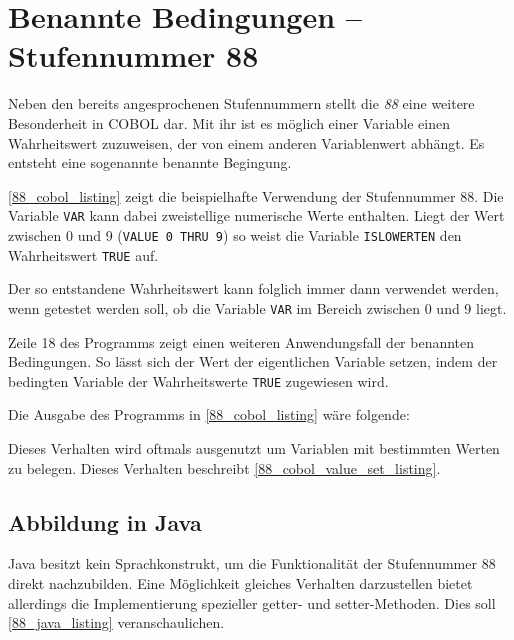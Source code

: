 \section{Benannte Bedingungen -- Stufennummer 88}
Neben den bereits angesprochenen Stufennummern stellt die \textit{88} eine weitere Besonderheit in COBOL dar. Mit ihr ist es möglich einer Variable einen Wahrheitswert zuzuweisen, der von einem anderen Variablenwert abhängt. Es entsteht eine sogenannte benannte Begingung.


\autoref{88_cobol_listing} zeigt die beispielhafte Verwendung der Stufennummer 88. Die Variable \texttt{VAR} kann dabei zweistellige numerische Werte enthalten. Liegt der Wert zwischen 0 und 9 (\texttt{VALUE 0 THRU 9}) so weist die Variable \texttt{ISLOWERTEN} den Wahrheitswert \texttt{TRUE} auf.

Der so entstandene Wahrheitswert kann folglich immer dann verwendet werden, wenn getestet werden soll, ob die Variable \texttt{VAR} im Bereich zwischen 0 und 9 liegt.

Zeile 18 des Programms zeigt einen weiteren Anwendungsfall der benannten Bedingungen. So lässt sich der Wert der eigentlichen Variable setzen, indem der bedingten Variable der Wahrheitswerte \texttt{TRUE} zugewiesen wird.

Die Ausgabe des Programms in \autoref{88_cobol_listing} wäre folgende:

Dieses Verhalten wird oftmals ausgenutzt um Variablen mit bestimmten Werten zu belegen. Dieses Verhalten beschreibt \autoref{88_cobol_value_set_listing}.


\subsection*{Abbildung in Java}
Java besitzt kein Sprachkonstrukt, um die Funktionalität der Stufennummer 88 direkt nachzubilden. Eine Möglichkeit gleiches Verhalten darzustellen bietet allerdings die Implementierung spezieller getter- und setter-Methoden. Dies soll \autoref{88_java_listing} veranschaulichen.

